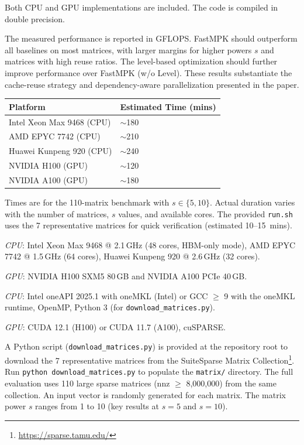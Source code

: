 \documentclass[conference]{IEEEtran}
\begin{document}
Both CPU and GPU implementations are included. The code is compiled in double precision.

\artexp

The measured performance is reported in GFLOPS. FastMPK should outperform all baselines on most matrices, with larger margins for higher powers $s$ and matrices with high reuse ratios. The level-based optimization should further improve performance over FastMPK (w/o Level). These results substantiate the cache-reuse strategy and dependency-aware parallelization presented in the paper.

\arttime

\begin{center}
\begin{tabular}{ll}
\toprule
Platform & Estimated Time (mins) \\
\midrule
Intel Xeon Max 9468 (CPU)  & $\sim$180 \\
AMD EPYC 7742 (CPU)        & $\sim$210 \\
Huawei Kunpeng 920 (CPU)   & $\sim$240 \\
NVIDIA H100 (GPU)          & $\sim$120 \\
NVIDIA A100 (GPU)          & $\sim$180 \\
\bottomrule
\end{tabular}
\end{center}
Times are for the 110-matrix benchmark with $s\in\{5,10\}$. Actual duration varies with the number of matrices, $s$ values, and available cores. The provided \texttt{run.sh} uses the 7 representative matrices for quick verification (estimated 10--15~mins).

\artin


\emph{CPU}: Intel Xeon Max 9468 @ 2.1\,GHz (48 cores, HBM-only mode), AMD EPYC 7742 @ 1.5\,GHz (64 cores), Huawei Kunpeng 920 @ 2.6\,GHz (32 cores).

\emph{GPU}: NVIDIA H100 SXM5 80\,GB and NVIDIA A100 PCIe 40\,GB.


\emph{CPU}: Intel oneAPI 2025.1 with oneMKL (Intel) or GCC $\ge$ 9 with the oneMKL runtime, OpenMP, Python 3 (for \texttt{download\_matrices.py}).

\emph{GPU}: CUDA 12.1 (H100) or CUDA 11.7 (A100), cuSPARSE.


A Python script (\texttt{download\_matrices.py}) is provided at the repository root to download the 7 representative matrices from the SuiteSparse Matrix Collection\footnote{\url{https://sparse.tamu.edu/}}. Run \texttt{python download\_matrices.py} to populate the \texttt{matrix/} directory. The full evaluation uses 110 large sparse matrices (nnz $\ge$ 8,000,000) from the same collection. An input vector is randomly generated for each matrix. The matrix power $s$ ranges from 1 to 10 (key results at $s=5$ and $s=10$).
\end{document}
